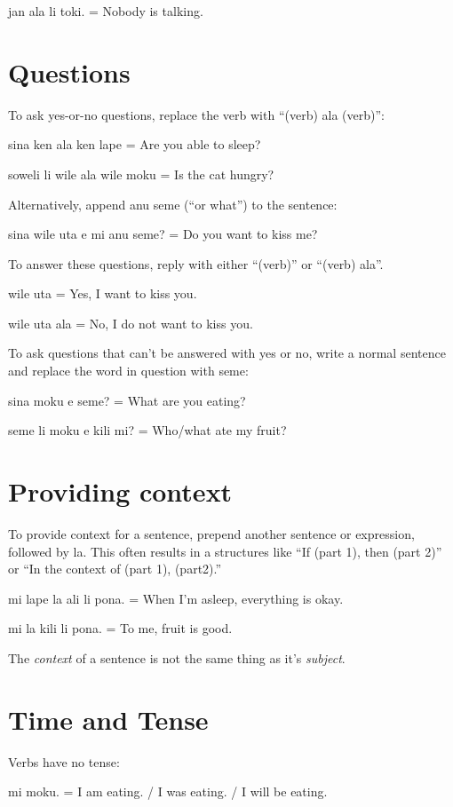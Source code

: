 \documentclass{article}
\begin{document}
\begin{multicols}{2}
\begin{ex}
  {\tpf jan ala li toki.} = Nobody is talking.
\end{ex}

\section*{Questions}
To ask yes-or-no questions, replace the verb with
“(verb) {\tpf ala} (verb)”:
\begin{ex}
  {\tpf sina ken ala ken lape} = Are you able to sleep?

  {\tpf soweli li wile ala wile moku} = Is the cat hungry?
\end{ex}

Alternatively, append {\tpf anu seme} (``or what”) to
the sentence:
\begin{ex}
  {\tpf sina wile uta e mi anu seme?} = Do you want to kiss me?
\end{ex}

To answer these questions, reply with either “(verb)” or
“(verb) {\tpf ala}”.
\begin{ex}
  {\tpf wile uta} = Yes, I want to kiss you.

  {\tpf wile uta ala} = No, I do not want to kiss you.
\end{ex}

To ask questions that can’t be answered with yes or no,
write a normal sentence and replace the word in question
with {\tpf seme}:
\begin{ex}
  {\tpf sina moku e seme?} = What are you eating?

  {\tpf seme li moku e kili mi?} = Who/what ate my fruit?
\end{ex}

\section*{Providing context}
To provide context for a sentence, prepend another
sentence or expression, followed by {\tpf la}.
This often results in a structures like
“If (part 1), then (part 2)” or “In the context of
(part 1), (part2).”
\begin{ex}
  {\tpf mi lape la ali li pona}. = When I’m asleep,
  everything is okay.

  {\tpf mi la kili li pona}. = To me, fruit is good.
\end{ex}

The \textit{context} of a sentence is not the same
thing as it's \textit{subject}.

\section*{Time and Tense}
Verbs have no tense:
\begin{ex}
  {\tpf mi moku.} = I am eating. / I was eating. / I will be eating.
\end{ex}


\end{multicols}
\end{document}
